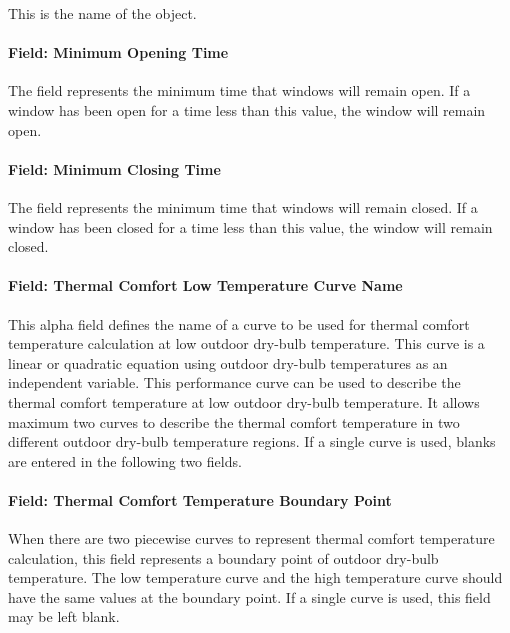 This is the name of the object.

\paragraph{Field: Minimum Opening Time}\label{field-minimum-opening-time}

The field represents the minimum time that windows will remain open. If a window has been open for a time less than this value, the window will remain open.

\paragraph{Field: Minimum Closing Time}\label{field-minimum-closing-time}

The field represents the minimum time that windows will remain closed. If a window has been closed for a time less than this value, the window will remain closed.

\paragraph{Field: Thermal Comfort Low Temperature Curve Name}\label{field-thermal-comfort-low-temperature-curve-name}

This alpha field defines the name of a curve to be used for thermal comfort temperature calculation at low outdoor dry-bulb temperature. This curve is a linear or quadratic equation using outdoor dry-bulb temperatures as an independent variable. This performance curve can be used to describe the thermal comfort temperature at low outdoor dry-bulb temperature. It allows maximum two curves to describe the thermal comfort temperature in two different outdoor dry-bulb temperature regions. If a single curve is used, blanks are entered in the following two fields.

\paragraph{Field: Thermal Comfort Temperature Boundary Point}\label{field-thermal-comfort-temperature-boundary-point}

When there are two piecewise curves to represent thermal comfort temperature calculation, this field represents a boundary point of outdoor dry-bulb temperature. The low temperature curve and the high temperature curve should have the same values at the boundary point. If a single curve is used, this field may be left blank.

